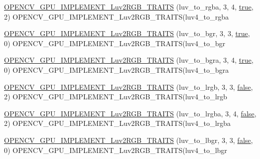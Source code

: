 \begin{DoxyCompactItemize}
\item 
\hyperlink{namespacecv_1_1gpu_1_1device_a6d5080155498ba4a9cd72e5282d7886b}{O\-P\-E\-N\-C\-V\-\_\-\-G\-P\-U\-\_\-\-I\-M\-P\-L\-E\-M\-E\-N\-T\-\_\-\-Luv2\-R\-G\-B\-\_\-\-T\-R\-A\-I\-T\-S} (luv\-\_\-to\-\_\-rgba, 3, 4, \hyperlink{namespacecv_1_1gpu_1_1device_ac34c172a7a1904fb0fd477321a31f926}{true}, 2) O\-P\-E\-N\-C\-V\-\_\-\-G\-P\-U\-\_\-\-I\-M\-P\-L\-E\-M\-E\-N\-T\-\_\-\-Luv2\-R\-G\-B\-\_\-\-T\-R\-A\-I\-T\-S(luv4\-\_\-to\-\_\-rgba
\item 
\hyperlink{namespacecv_1_1gpu_1_1device_ace755ad55474b51e817e36de83761764}{O\-P\-E\-N\-C\-V\-\_\-\-G\-P\-U\-\_\-\-I\-M\-P\-L\-E\-M\-E\-N\-T\-\_\-\-Luv2\-R\-G\-B\-\_\-\-T\-R\-A\-I\-T\-S} (luv\-\_\-to\-\_\-bgr, 3, 3, \hyperlink{namespacecv_1_1gpu_1_1device_ac34c172a7a1904fb0fd477321a31f926}{true}, 0) O\-P\-E\-N\-C\-V\-\_\-\-G\-P\-U\-\_\-\-I\-M\-P\-L\-E\-M\-E\-N\-T\-\_\-\-Luv2\-R\-G\-B\-\_\-\-T\-R\-A\-I\-T\-S(luv4\-\_\-to\-\_\-bgr
\item 
\hyperlink{namespacecv_1_1gpu_1_1device_aa32ebdf83da6187b4951fd72cada9e54}{O\-P\-E\-N\-C\-V\-\_\-\-G\-P\-U\-\_\-\-I\-M\-P\-L\-E\-M\-E\-N\-T\-\_\-\-Luv2\-R\-G\-B\-\_\-\-T\-R\-A\-I\-T\-S} (luv\-\_\-to\-\_\-bgra, 3, 4, \hyperlink{namespacecv_1_1gpu_1_1device_ac34c172a7a1904fb0fd477321a31f926}{true}, 0) O\-P\-E\-N\-C\-V\-\_\-\-G\-P\-U\-\_\-\-I\-M\-P\-L\-E\-M\-E\-N\-T\-\_\-\-Luv2\-R\-G\-B\-\_\-\-T\-R\-A\-I\-T\-S(luv4\-\_\-to\-\_\-bgra
\item 
\hyperlink{namespacecv_1_1gpu_1_1device_a08effe62bf7db8327b863d1512ec9112}{O\-P\-E\-N\-C\-V\-\_\-\-G\-P\-U\-\_\-\-I\-M\-P\-L\-E\-M\-E\-N\-T\-\_\-\-Luv2\-R\-G\-B\-\_\-\-T\-R\-A\-I\-T\-S} (luv\-\_\-to\-\_\-lrgb, 3, 3, \hyperlink{namespacecv_1_1gpu_1_1device_af8d6418be1712e83b4f398e7e7273026}{false}, 2) O\-P\-E\-N\-C\-V\-\_\-\-G\-P\-U\-\_\-\-I\-M\-P\-L\-E\-M\-E\-N\-T\-\_\-\-Luv2\-R\-G\-B\-\_\-\-T\-R\-A\-I\-T\-S(luv4\-\_\-to\-\_\-lrgb
\item 
\hyperlink{namespacecv_1_1gpu_1_1device_a449770975fffcb4b5ced122208344983}{O\-P\-E\-N\-C\-V\-\_\-\-G\-P\-U\-\_\-\-I\-M\-P\-L\-E\-M\-E\-N\-T\-\_\-\-Luv2\-R\-G\-B\-\_\-\-T\-R\-A\-I\-T\-S} (luv\-\_\-to\-\_\-lrgba, 3, 4, \hyperlink{namespacecv_1_1gpu_1_1device_af8d6418be1712e83b4f398e7e7273026}{false}, 2) O\-P\-E\-N\-C\-V\-\_\-\-G\-P\-U\-\_\-\-I\-M\-P\-L\-E\-M\-E\-N\-T\-\_\-\-Luv2\-R\-G\-B\-\_\-\-T\-R\-A\-I\-T\-S(luv4\-\_\-to\-\_\-lrgba
\item 
\hyperlink{namespacecv_1_1gpu_1_1device_abe39fafe880d852efc67413531e2a980}{O\-P\-E\-N\-C\-V\-\_\-\-G\-P\-U\-\_\-\-I\-M\-P\-L\-E\-M\-E\-N\-T\-\_\-\-Luv2\-R\-G\-B\-\_\-\-T\-R\-A\-I\-T\-S} (luv\-\_\-to\-\_\-lbgr, 3, 3, \hyperlink{namespacecv_1_1gpu_1_1device_af8d6418be1712e83b4f398e7e7273026}{false}, 0) O\-P\-E\-N\-C\-V\-\_\-\-G\-P\-U\-\_\-\-I\-M\-P\-L\-E\-M\-E\-N\-T\-\_\-\-Luv2\-R\-G\-B\-\_\-\-T\-R\-A\-I\-T\-S(luv4\-\_\-to\-\_\-lbgr

\end{DoxyCompactItemize}
